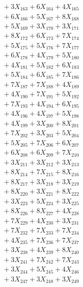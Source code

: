 \documentclass[a4paper,10pt]{article}
\begin{document}
{\begin{align}
&\;  + 3 X_{163} + 6 X_{164} + 4 X_{165} \\[0.3ex]
&\;  + 6 X_{166} + 5 X_{167} + 8 X_{168} \\[0.3ex]
&\;  + 5 X_{169} + 3 X_{170} + 3 X_{171} \\[0.3ex]
&\;  + 8 X_{172} + 6 X_{173} + 7 X_{174} \\[0.3ex]
&\;  + 5 X_{175} + 5 X_{176} + 7 X_{177} \\[0.3ex]
&\;  + 6 X_{178} + 4 X_{179} + 5 X_{180} \\[0.3ex]
&\;  + 4 X_{181} + 5 X_{182} + 6 X_{183} \\[0.3ex]
&\;  + 5 X_{184} + 6 X_{185} + 7 X_{186} \\[0.3ex]
&\;  + 7 X_{187} + 7 X_{188} + 4 X_{189} \\[0.5ex]\allowbreak
&\;  + 4 X_{190} + 7 X_{191} + 5 X_{192} \\[0.3ex]
&\;  + 7 X_{193} + 4 X_{194} + 6 X_{195} \\[0.3ex]
&\;  + 4 X_{196} + 4 X_{197} + 5 X_{198} \\[0.3ex]
&\;  + 4 X_{199} + 3 X_{200} + 8 X_{201} \\[0.3ex]
&\;  + 7 X_{202} + 3 X_{203} + 5 X_{204} \\[0.3ex]
&\;  + 5 X_{205} + 7 X_{206} + 6 X_{207} \\[0.3ex]
&\;  + 6 X_{208} + 6 X_{209} + 7 X_{210} \\[0.3ex]
&\;  + 3 X_{211} + 3 X_{212} + 3 X_{213} \\[0.3ex]
&\;  + 8 X_{214} + 7 X_{215} + 8 X_{216} \\[0.3ex]
&\;  + 8 X_{217} + 3 X_{218} + 3 X_{219} \\[0.5ex]\allowbreak
&\;  + 8 X_{220} + 3 X_{221} + 8 X_{222} \\[0.3ex]
&\;  + 3 X_{223} + 5 X_{224} + 3 X_{225} \\[0.3ex]
&\;  + 8 X_{226} + 8 X_{227} + 4 X_{228} \\[0.3ex]
&\;  + 7 X_{229} + 4 X_{230} + 3 X_{231} \\[0.3ex]
&\;  + 7 X_{232} + 7 X_{233} + 7 X_{234} \\[0.3ex]
&\;  + 4 X_{235} + 7 X_{236} + 7 X_{237} \\[0.3ex]
&\;  + 3 X_{238} + 4 X_{239} + 8 X_{240} \\[0.3ex]
&\;  + 3 X_{241} + 7 X_{242} + 7 X_{243} \\[0.3ex]
&\;  + 3 X_{244} + 5 X_{245} + 4 X_{246} \\[0.3ex]
&\;  + 3 X_{247} + 3 X_{248} + 3 X_{249} \\[0.5ex]\allowbreak

\end{align}}
\end{document}
